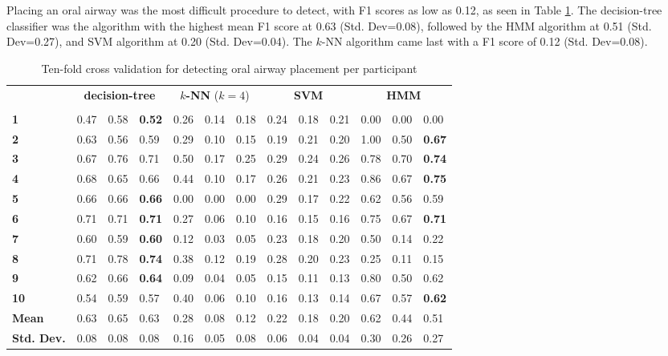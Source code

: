 \par Placing an oral airway was the most difficult procedure to detect, with F1 scores as low as 0.12, as seen in Table \ref{tab:o:ml}. The decision-tree classifier was the algorithm with the highest mean F1 score at 0.63 (Std. Dev=0.08), followed by the HMM algorithm at 0.51 (Std. Dev=0.27), and SVM algorithm at 0.20 (Std. Dev=0.04). The $k$-NN algorithm came last with a F1 score of 0.12 (Std. Dev=0.08).
\begin{table}[h]
	\centering
	\begin{tabular}{lllllllllllll}
		\multirow{2}{*}{\rotatebox[origin=c]{45}{\textbf{Participant}}} & \multicolumn{3}{c}{\textbf{decision-tree}} & \multicolumn{3}{c}{\textbf{$k$-NN} ($k=4$)} & \multicolumn{3}{c}{\textbf{SVM}} & \multicolumn{3}{c}{\textbf{HMM}} \\
		& \rot{Precision}     & \rot{Recall}    & \rot{F1}    & \rot{Precision}     & \rot{Recall}    & \rot{F1}  & \rot{Precision}     & \rot{Recall}    & \rot{F1} & \rot{Precision}     & \rot{Recall}    & \rot{F1} \\
		\textbf{1}   & 0.47 & 0.58 & \textbf{0.52} & 0.26 & 0.14 & 0.18 & 0.24 & 0.18 & 0.21 & 0.00 & 0.00 & 0.00 \\
		\textbf{2}   & 0.63 & 0.56 & 0.59 & 0.29 & 0.10 & 0.15 & 0.19 & 0.21 & 0.20 & 1.00 & 0.50 & \textbf{0.67} \\
		\textbf{3}   & 0.67 & 0.76 & 0.71 & 0.50 & 0.17 & 0.25 & 0.29 & 0.24 & 0.26 & 0.78 & 0.70 & \textbf{0.74} \\
		\textbf{4}   & 0.68 & 0.65 & 0.66 & 0.44 & 0.10 & 0.17 & 0.26 & 0.21 & 0.23 & 0.86 & 0.67 & \textbf{0.75} \\
		\textbf{5}   & 0.66 & 0.66 & \textbf{0.66} & 0.00 & 0.00 & 0.00 & 0.29 & 0.17 & 0.22 & 0.62 & 0.56 & 0.59 \\
		\textbf{6}   & 0.71 & 0.71 & \textbf{0.71} & 0.27 & 0.06 & 0.10 & 0.16 & 0.15 & 0.16 & 0.75 & 0.67 & \textbf{0.71} \\
		\textbf{7}   & 0.60 & 0.59 & \textbf{0.60} & 0.12 & 0.03 & 0.05 & 0.23 & 0.18 & 0.20 & 0.50 & 0.14 & 0.22 \\
		\textbf{8}   & 0.71 & 0.78 & \textbf{0.74} & 0.38 & 0.12 & 0.19 & 0.28 & 0.20 & 0.23 & 0.25 & 0.11 & 0.15 \\
		\textbf{9}   & 0.62 & 0.66 & \textbf{0.64} & 0.09 & 0.04 & 0.05 & 0.15 & 0.11 & 0.13 & 0.80 & 0.50 & 0.62 \\
		\textbf{10} & 0.54 & 0.59 & 0.57 & 0.40 & 0.06 & 0.10 & 0.16 & 0.13 & 0.14 & 0.67 & 0.57 & \textbf{0.62} \\
		\hline
		\textbf{Mean} & 0.63 & 0.65 & 0.63 & 0.28 & 0.08 & 0.12 & 0.22 & 0.18 & 0.20 & 0.62 & 0.44 & 0.51 \\
		\textbf{Std. Dev.} & 0.08 & 0.08 & 0.08 & 0.16 & 0.05 & 0.08 & 0.06 & 0.04 & 0.04 & 0.30 & 0.26 & 0.27 \\
	\end{tabular}
	\caption{Ten-fold cross validation for detecting oral airway placement per participant}
	\label{tab:o:ml}
\end{table}

